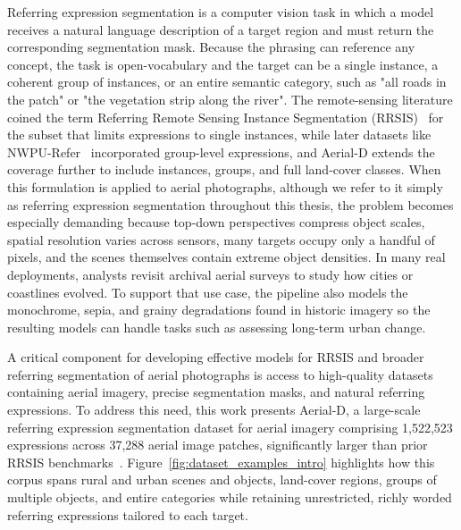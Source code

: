 \cleardoublepage
\label{chap:intro}
Referring expression segmentation is a computer vision task in which a model receives a natural language description of a target region and must return the corresponding segmentation mask. Because the phrasing can reference any concept, the task is open-vocabulary and the target can be a single instance, a coherent group of instances, or an entire semantic category, such as "all roads in the patch" or "the vegetation strip along the river". The remote-sensing literature coined the term Referring Remote Sensing Instance Segmentation (RRSIS)~\cite{yuan2023rrsis} for the subset that limits expressions to single instances, while later datasets like NWPU-Refer~\cite{yang2024large} incorporated group-level expressions, and Aerial-D extends the coverage further to include instances, groups, and full land-cover classes. When this formulation is applied to aerial photographs, although we refer to it simply as referring expression segmentation throughout this thesis, the problem becomes especially demanding because top-down perspectives compress object scales, spatial resolution varies across sensors, many targets occupy only a handful of pixels, and the scenes themselves contain extreme object densities. In many real deployments, analysts revisit archival aerial surveys to study how cities or coastlines evolved. To support that use case, the pipeline also models the monochrome, sepia, and grainy degradations found in historic imagery so the resulting models can handle tasks such as assessing long-term urban change.

A critical component for developing effective models for RRSIS and broader referring segmentation of aerial photographs is access to high-quality datasets containing aerial imagery, precise segmentation masks, and natural referring expressions. To address this need, this work presents Aerial-D, a large-scale referring expression segmentation dataset for aerial imagery comprising 1,522,523 expressions across 37,288 aerial image patches, significantly larger than prior RRSIS benchmarks~\cite{yuan2023rrsis,liu2024rotated,yang2024large}. Figure~\ref{fig:dataset_examples_intro} highlights how this corpus spans rural and urban scenes and objects, land-cover regions, groups of multiple objects, and entire categories while retaining unrestricted, richly worded referring expressions tailored to each target.

